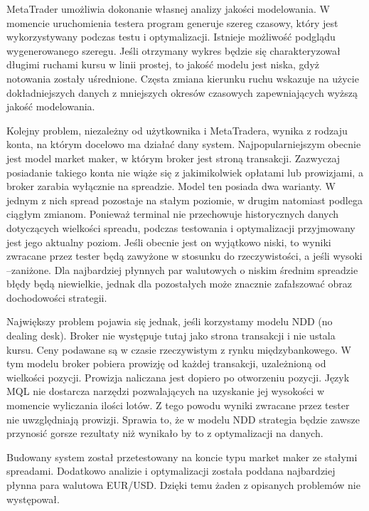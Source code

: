 \documentclass[pdflatex,11pt]{aghdpl}
\begin{document}
MetaTrader umożliwia dokonanie własnej analizy jakości modelowania. W momencie uruchomienia testera program generuje szereg czasowy, który jest wykorzystywany podczas testu i optymalizacji. Istnieje możliwość podglądu wygenerowanego szeregu. Jeśli otrzymany wykres będzie się charakteryzował długimi ruchami kursu w linii prostej, to jakość modelu jest niska, gdyż notowania zostały uśrednione. Częsta zmiana kierunku ruchu wskazuje na użycie dokładniejszych danych z mniejszych okresów czasowych zapewniających wyższą jakość modelowania. 

Kolejny problem, niezależny od użytkownika i MetaTradera, wynika z rodzaju konta, na którym docelowo ma działać dany system. Najpopularniejszym obecnie jest model market maker, w którym broker jest stroną transakcji. Zazwyczaj posiadanie takiego konta nie wiąże się z jakimikolwiek opłatami lub prowizjami, a broker zarabia wyłącznie na spreadzie. Model ten posiada dwa warianty. W jednym z nich spread pozostaje na stałym poziomie, w drugim natomiast podlega ciągłym zmianom. Ponieważ terminal nie przechowuje historycznych
danych dotyczących wielkości spreadu, podczas testowania i optymalizacji przyjmowany jest jego aktualny poziom. Jeśli obecnie jest on wyjątkowo niski, to wyniki zwracane przez tester będą zawyżone w stosunku do rzeczywistości, a jeśli wysoki –zaniżone. Dla najbardziej płynnych par walutowych o niskim średnim spreadzie błędy będą niewielkie, jednak dla pozostałych może znacznie zafałszować obraz dochodowości strategii.

Największy problem pojawia się jednak, jeśli korzystamy modelu NDD (no dealing desk). Broker nie występuje tutaj jako strona transakcji i nie ustala kursu. Ceny podawane są w czasie rzeczywistym z rynku międzybankowego. W tym modelu broker pobiera prowizję od każdej transakcji, uzależnioną od wielkości pozycji. Prowizja naliczana jest dopiero po otworzeniu pozycji. Język MQL nie dostarcza narzędzi pozwalających na uzyskanie jej wysokości w momencie wyliczania ilości lotów. Z tego powodu wyniki zwracane przez tester nie uwzględniają prowizji. Sprawia to, że w modelu NDD strategia będzie zawsze przynosić gorsze rezultaty niż wynikało by to z optymalizacji na danych.

Budowany system został przetestowany na koncie typu market maker ze stałymi spreadami. Dodatkowo analizie i optymalizacji została poddana najbardziej płynna para walutowa EUR/USD. Dzięki temu żaden z opisanych problemów nie występował.
\end{document}
